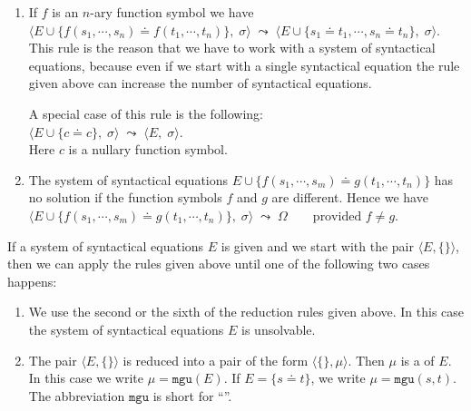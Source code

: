 \begin{enumerate}
      $\Big\langle E \cup \big\{ x \doteq x \big\},\; \sigma \Big\rangle \quad\leadsto\quad
        \Big\langle E,\; \sigma \Big\rangle \qquad\mbox{if $x \in \mathcal{V}$.}
      $  
\item If $f$ is an  $n$-ary function symbol we have 
      \\[0.2cm]
      \hspace*{1.3cm}
      $\Big\langle E \cup \big\{ f(s_1,\cdots,s_n) \doteq f(t_1,\cdots,t_n) \big\},\; \sigma \Big\rangle 
         \;\leadsto\; 
         \Big\langle E \cup \big\{ s_1 \doteq t_1, \cdots, s_n \doteq t_n\},\; \sigma \Big\rangle.
      $   
      \\[0.2cm]
      This rule is the reason that we have to work with a system of syntactical equations, because even if we
      start with a single syntactical equation the rule given above can increase the number of syntactical
      equations. 

      A special case of this rule is the following: 
      \\[0.2cm]
      \hspace*{1.3cm}
      $\Big\langle E \cup \big\{ c \doteq c \big\},\; \sigma \Big\rangle \;\leadsto\; 
       \Big\langle E,\; \sigma \Big\rangle$.
      \\[0.2cm]
      Here $c$ is a nullary function symbol.
\item The system of syntactical equations $E \cup \big\{ f(s_1,\cdots,s_m) \doteq g(t_1,\cdots,t_n) \big\}$ has
      no solution if the function symbols $f$ and $g$ are different.  Hence we have
      \\[0.2cm]
      \hspace*{1.3cm}
      $\Big\langle E \cup \big\{ f(s_1,\cdots,s_m) \doteq g(t_1,\cdots,t_n) \big\},\;
      \sigma \Big\rangle \;\leadsto\; \Omega \qquad \mbox{provided $f \not= g$}$. 
\end{enumerate}
If a system of syntactical equations $E$ is given and we start with the pair 
$\langle E, \{\}\rangle$, then we can apply the rules given above until one of the following two cases happens: 
\begin{enumerate}
\item We use the second or the sixth of the reduction rules given above.
      In this case the system of syntactical equations $E$ is unsolvable.
\item The pair $\langle E, \{\} \rangle$ is reduced into a pair of the form $\langle \{\}, \mu\rangle$.
      Then $\mu$ is a   of $E$.  In this case we write $\mu = \mathtt{mgu}(E)$.
      If $E = \{ s \doteq t \}$, we write $\mu = \mathtt{mgu}(s, t)$.  The abbreviation
      $\mathtt{mgu}$ is short for {``''}.
\end{enumerate}

